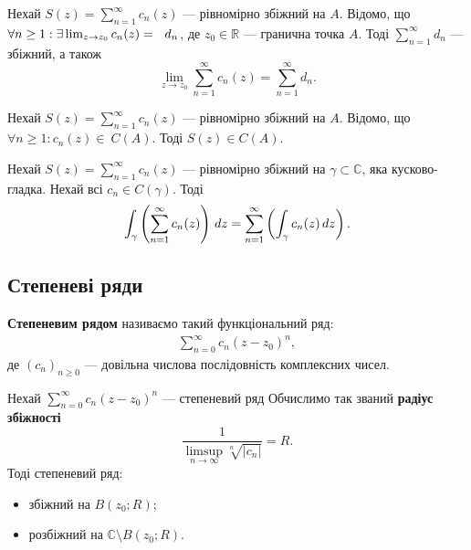 \documentclass{math_library}
\begin{document}
\begin{theorem}
Нехай $S(z) = \displaystyle\sum_{n=1}^\infty c_n(z)$ --- рівномірно збіжний на $A$. Відомо, що $\forall n \geq 1: \exists \huge\lim_{z \to z_0} c_n(z) = ~{d_n}$, де $z_0 \in \mathbb{R}$ --- гранична точка $A$. Тоді $\displaystyle\sum_{n=1}^\infty d_n$ --- збіжний, а також \[
\displaystyle\lim_{z \to z_0} \sum_{n=1}^\infty c_n(z) = \sum_{n=1}^\infty d_n.
\]
\end{theorem}

\begin{corollary}
Нехай $S(z) = \displaystyle \sum_{n=1}^\infty c_n(z)$ --- рівномірно збіжний на $A$. Відомо, що $\forall n \geq 1: c_n(z) \in ~{C(A)}$. Тоді $S(z) \in C(A)$.
\end{corollary}

\begin{theorem}
Нехай $S(z) = \displaystyle\sum_{n=1}^\infty c_n(z)$ --- рівномірно збіжний на $\gamma \subset \mathbb{C}$, яка кусково-гладка. Нехай всі $c_n \in C(\gamma)$. Тоді
\begin{align*}
\huge \int_\gamma \left( \sum_{n=1}^\infty c_n(z) \right) \,dz = \sum_{n=1}^\infty \left( \int_\gamma c_n(z)\,dz \right).
\end{align*}
\end{theorem}

\subsection{Степеневі ряди}
\begin{definition}
\textbf{Степеневим рядом} називаємо такий функціональний ряд:
\begin{align*}
\sum_{n=0}^\infty c_n(z-z_0)^n,
\end{align*}
де $(c_n)_{n \geq 0}$ --- довільна числова послідовність комплексних чисел.
\end{definition}

\begin{theorem}
Нехай $\displaystyle\sum_{n=0}^\infty c_n(z-z_0)^n$ --- степеневий ряд Обчислимо так званий \textbf{радіус збіжності}
\[
\dfrac{1}{\displaystyle \limsup_{n \to \infty} \sqrt[n]{|c_n|}} = R.
\]
Тоді степеневий ряд:
\begin{itemize}[nosep,wide=0pt]
\item збіжний на $B(z_0;R)$;
\item розбіжний на $\mathbb{C} \setminus B(z_0;R)$.
\end{itemize}
\end{theorem}
\end{document}
